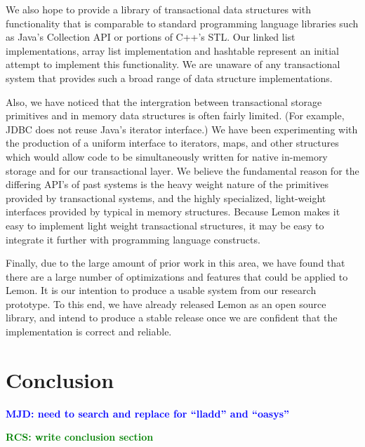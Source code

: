 \documentclass[letterpaper,twocolumn,english]{article}
\newcommand{\yad}{Lemon\xspace}
\newcommand{\rcs}[1]{\textcolor{green}{\bf RCS: #1}}
\newcommand{\mjd}[1]{\textcolor{blue}{\bf MJD: #1}}
\begin{document}
We also hope to provide a library of
transactional data structures with functionality that is comparable to
standard programming language libraries such as Java's Collection API
or portions of C++'s STL.  Our linked list implementations, array list
implementation and hashtable represent an initial attempt to implement
this functionality.  We are unaware of any transactional system that
provides such a broad range of data structure implementations.  

Also, we have noticed that the intergration between transactional
storage primitives and in memory data structures is often fairly
limited.  (For example, JDBC does not reuse Java's iterator
interface.)  We have been experimenting with the production of a
uniform interface to iterators, maps, and other structures which would
allow code to be simultaneously written for native in-memory storage
and for our transactional layer.  We believe the fundamental reason
for the differing API's of past systems is the heavy weight nature of
the primitives provided by transactional systems, and the highly
specialized, light-weight interfaces provided by typical in memory
structures.  Because \yad makes it easy to implement light weight
transactional structures, it may be easy to integrate it further with
programming language constructs.

Finally, due to the large amount of prior work in this area, we have
found that there are a large number of optimizations and features that
could be applied to \yad.  It is our intention to produce a usable
system from our research prototype.  To this end, we have already
released \yad as an open source library, and intend to produce a
stable release once we are confident that the implementation is correct
and reliable.  


\section{Conclusion}

\mjd{need to search and replace for ``lladd'' and ``oasys''}


\rcs{write conclusion section}
\end{document}
